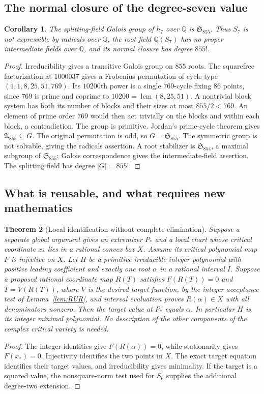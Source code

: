 \documentclass[11pt]{article}
\newtheorem{theorem}{Theorem}[section]
\newtheorem{corollary}[theorem]{Corollary}
\newcommand{\Q}{\mathbb Q}
\begin{document}
\subsection{The normal closure of the degree-seven value}
\begin{corollary}\label{cor:galois}
The splitting-field Galois group of $h_7$ over $\Q$ is
$\mathfrak S_{855}$. Thus $S_7$ is not expressible by radicals over
$\Q$, the root field $\Q(S_7)$ has no proper intermediate fields over
$\Q$, and its normal closure has degree $855!$.
\end{corollary}
\begin{proof}
Irreducibility gives a transitive Galois group on $855$ roots.
The squarefree factorization at $1000037$ gives a Frobenius permutation
of cycle type $(1,1,8,25,51,769)$. Its $10200$th power is a single
$769$-cycle fixing $86$ points, since $769$ is prime and coprime to
$10200=\operatorname{lcm}(8,25,51)$. A nontrivial block system has both
its number of blocks and their sizes at most $855/2<769$. An element of
prime order $769$ would then act trivially on the blocks and within each
block, a contradiction. The group is primitive. Jordan's prime-cycle
theorem \cite[Theorem~1.1]{Jones2014} gives
$\mathfrak A_{855}\subseteq G$. The original permutation is odd, so
$G=\mathfrak S_{855}$. The symmetric group is not solvable, giving the
radicals assertion. A root stabilizer is $\mathfrak S_{854}$, a maximal
subgroup of $\mathfrak S_{855}$; Galois correspondence gives the
intermediate-field assertion. The splitting field has degree $|G|=855!$.
\end{proof}

\subsection{What is reusable, and what requires new mathematics}
\begin{theorem}[Local identification without complete elimination]\label{thm:local-identification}
Suppose a separate global argument gives an extremizer $P_*$ and a local
chart whose critical coordinate $x_*$ lies in a rational convex box $X$.
Assume its critical polynomial map $F$ is injective on $X$. Let $H$
be a primitive irreducible integer polynomial with positive leading
coefficient and exactly one root
$\alpha$ in a rational interval $I$. Suppose a proposed rational
coordinate map $R(T)$ satisfies $F(R(T))=0$ and
$T=V(R(T))$, where $V$ is the desired target function, by
the integer acceptance test of Lemma~\ref{lem:RUR}, and interval
evaluation proves $R(\alpha)\in X$ with all denominators nonzero.
Then the target value at $P_*$ equals $\alpha$. In particular $H$ is
its integer minimal polynomial. No description of the other components
of the complex critical variety is needed.
\end{theorem}
\begin{proof}
The integer identities give $F(R(\alpha))=0$, while stationarity gives
$F(x_*)=0$. Injectivity identifies the two points in $X$. The exact
target equation identifies their target values, and irreducibility
gives minimality. If the target is a squared value, the nonsquare-norm
test used for $S_6$ supplies the additional degree-two extension.
\end{proof}
\end{document}
